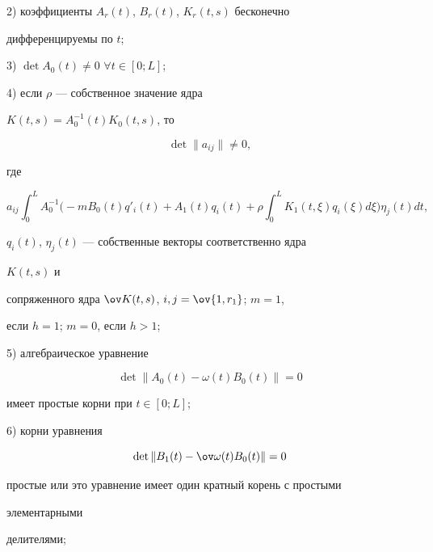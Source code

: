 2) коэффициенты $A_r(t)$, $B_r(t)$, $K_r(t,s)$ бесконечно 


дифференцируемы по $t$; 


 


3) $\det A_0(t)\ne0$\; $\forall t\in[0;L]$; 


 


4) если $\rho$ --- собственное значение ядра 


$K(t,s)=A^{-1}_0(t)K_0(t,s)$, то 


$$ 


\det\|a_{ij}\|\ne0, 


$$ 


где 


$$ 


a_{ij}\int^L_0 A^{-1}_0\bigg(-m B_0(t)q'_i(t)+ 


A_1(t)q_i(t)+\rho\int^L_0 K_1(t,\xi) 


q_i(\xi)d\xi\bigg)\eta_j(t)dt, 


$$ 


$q_i(t)$, $\eta_j(t)$ --- собственные векторы соответственно ядра 


$K(t,s)$ и 


сопряженного ядра $\ov K(t,s)$, $i,j=\ov{1,r_1}$; $m=1$, 


если $h=1$; $m=0$, если $h>1$; 


 


5) алгебраическое уравнение 


\begin{equation} 


\det\|A_0(t)-\omega(t)B_0(t)\|=0 


\end{equation} 


имеет простые корни при $t\in[0;L]$; 


 


6) корни уравнения 


\begin{equation} 


\det\|B_1(t)-\ov\omega(t)B_0(t)\|=0 


\end{equation} 


простые или это уравнение имеет один кратный корень с простыми 


элементарными 


делителями; 


